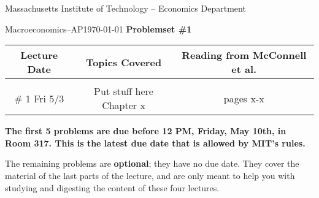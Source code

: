 \newcommand{\coursename}{Macroeconomics--AP}
\newcommand{\affiliation}{Massachusetts Institute of Technology -- Economics Department}

\begin{center}
  \small{\affiliation}

  \noindent
  \vspace{0.1em}

  \coursename \hfill \small\today
  \linebreak
  {\large\textbf{Problemset \#1}}

  \vspace{0.5em}

\end{center}
\begin{center}
  \footnotesize
  \begin{tabular}{ c c c }
    \textbf{Lecture Date} & \textbf{Topics Covered}  & \textbf{Reading from McConnell et al.} \\
    \hline                                                                                    \\
    \vspace{1em}
    \# 1 Fri 5/3          & Put stuff here Chapter x & pages x-x                              \\
    \hline
  \end{tabular}
\end{center}

\begin{center}
  \footnotesize\textbf{The first 5 problems are due before 12 PM, Friday, May 10th, in Room 317. This is the latest due date that is allowed by MIT's rules.}
\end{center}
\noindent\footnotesize
The remaining problems are \textbf{optional}; they have no due date.
They cover the material of the last parts of the lecture, and are only
meant to help you with studying and digesting the content of these four
lectures.